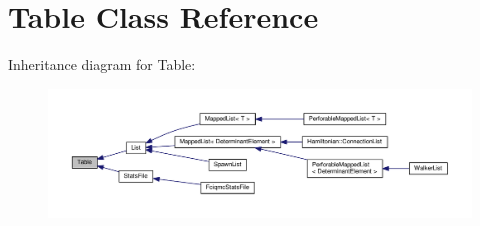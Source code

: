 \hypertarget{classTable}{}\section{Table Class Reference}
\label{classTable}


Inheritance diagram for Table\+:
\nopagebreak
\begin{figure}[H]
\begin{center}
\leavevmode
\includegraphics[width=350pt]{classTable__inherit__graph}
\end{center}
\end{figure}
